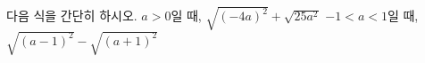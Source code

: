 다음 식을 간단히 하시오.
 $a>0$일 때, $\sqrt{(-4a)^2}+\sqrt{25a^2}$
 $-1<a<1$일 때, $\sqrt{(a-1)^2}-\sqrt{(a+1)^2}$
